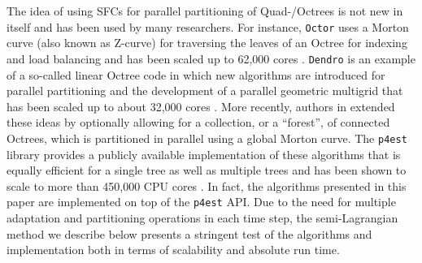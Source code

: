 The idea of using SFCs for parallel partitioning of Quad-/Octrees is not new in itself and has been used by many researchers. For instance, \texttt{Octor} \cite{Tu;OHallaron;Ghattas:05:Scalable-parallel-oc} uses a Morton curve (also known as Z-curve) for traversing the leaves of an Octree for indexing and load balancing and has been scaled up to 62,000 cores \cite{Burstedde;Ghattas;Gurnis;etal:08:Scalable-adaptive-ma}.
\texttt{Dendro} \cite{Sampath;Adavani;Sundar;etal:08:Dendro:-parallel-alg} is
an example of a so-called linear Octree code in which new algorithms are
introduced for parallel partitioning and the development of a parallel
geometric multigrid that has been scaled up to about 32,000 cores
\cite{Sampath;Biros:10:A-parallel-geometric}.
More recently, authors in
\cite{Burstedde;Wilcox;Ghattas:11:p4est:-Scalable-Algo} extended these ideas by
optionally allowing for a collection, or a ``forest'', of connected Octrees,
which is partitioned in parallel using a global Morton curve.
%
%
%
The \texttt{p4est} library \cite{p4est-github} provides a publicly available
implementation of these algorithms that is equally efficient for a single tree
as well as multiple trees and has been shown to scale to more than
450,000 CPU cores \cite{IsaacBursteddeWilcoxEtAl15}.
In fact, the algorithms presented in this paper are implemented on top of
the \texttt{p4est} API.
Due to the need for multiple adaptation and partitioning operations in each
time step, the semi-Lagrangian method we describe below presents a stringent
test of the algorithms and implementation both in terms of scalability and
absolute run time.
%

